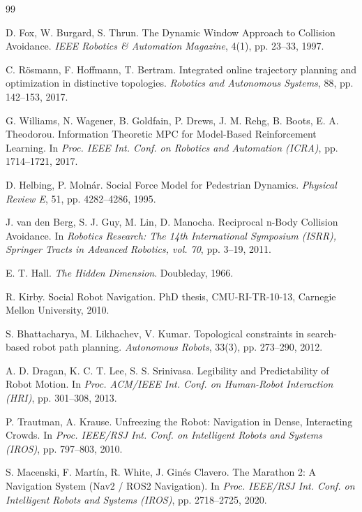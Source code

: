 \documentclass[11pt]{article}
\begin{document}
\begin{thebibliography}{99}

 D. Fox, W. Burgard, S. Thrun. The Dynamic Window Approach to Collision Avoidance. \emph{IEEE Robotics \& Automation Magazine}, 4(1), pp. 23--33, 1997.

 C. R\"osmann, F. Hoffmann, T. Bertram. Integrated online trajectory planning and optimization in distinctive topologies. \emph{Robotics and Autonomous Systems}, 88, pp. 142--153, 2017.

 G. Williams, N. Wagener, B. Goldfain, P. Drews, J. M. Rehg, B. Boots, E. A. Theodorou. Information Theoretic MPC for Model-Based Reinforcement Learning. In \emph{Proc. IEEE Int. Conf. on Robotics and Automation (ICRA)}, pp. 1714--1721, 2017.

 D. Helbing, P. Moln\'ar. Social Force Model for Pedestrian Dynamics. \emph{Physical Review E}, 51, pp. 4282--4286, 1995.

 J. van den Berg, S. J. Guy, M. Lin, D. Manocha. Reciprocal n-Body Collision Avoidance. In \emph{Robotics Research: The 14th International Symposium (ISRR), Springer Tracts in Advanced Robotics, vol. 70}, pp. 3--19, 2011.

 E. T. Hall. \emph{The Hidden Dimension}. Doubleday, 1966.

 R. Kirby. Social Robot Navigation. PhD thesis, CMU-RI-TR-10-13, Carnegie Mellon University, 2010.

 S. Bhattacharya, M. Likhachev, V. Kumar. Topological constraints in search-based robot path planning. \emph{Autonomous Robots}, 33(3), pp. 273--290, 2012.

 A. D. Dragan, K. C. T. Lee, S. S. Srinivasa. Legibility and Predictability of Robot Motion. In \emph{Proc. ACM/IEEE Int. Conf. on Human-Robot Interaction (HRI)}, pp. 301--308, 2013.

 P. Trautman, A. Krause. Unfreezing the Robot: Navigation in Dense, Interacting Crowds. In \emph{Proc. IEEE/RSJ Int. Conf. on Intelligent Robots and Systems (IROS)}, pp. 797--803, 2010.

 S. Macenski, F. Mart\'in, R. White, J. Gin\'es Clavero. The Marathon 2: A Navigation System (Nav2 / ROS2 Navigation). In \emph{Proc. IEEE/RSJ Int. Conf. on Intelligent Robots and Systems (IROS)}, pp. 2718--2725, 2020.


\end{thebibliography}
\end{document}

